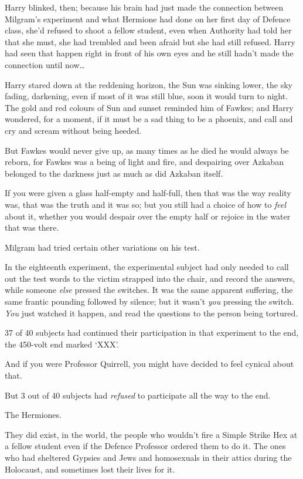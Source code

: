 Harry blinked, then; because his brain had just made the connection between Milgram’s experiment and what Hermione had done on her first day of Defence class, she’d refused to shoot a fellow student, even when Authority had told her that she must, she had trembled and been afraid but she had still refused. Harry had seen that happen right in front of his own eyes and he still hadn’t made the connection until now…

Harry stared down at the reddening horizon, the Sun was sinking lower, the sky fading, darkening, even if most of it was still blue, soon it would turn to night. The gold and red colours of Sun and sunset reminded him of Fawkes; and Harry wondered, for a moment, if it must be a sad thing to be a phoenix, and call and cry and scream without being heeded.

But Fawkes would never give up, as many times as he died he would always be reborn, for Fawkes was a being of light and fire, and despairing over Azkaban belonged to the darkness just as much as did Azkaban itself.

If you were given a glass half-empty and half-full, then that was the way reality was, that was the truth and it was so; but you still had a choice of how to \emph{feel} about it, whether you would despair over the empty half or rejoice in the water that was there.

Milgram had tried certain other variations on his test.

In the eighteenth experiment, the experimental subject had only needed to call out the test words to the victim strapped into the chair, and record the answers, while someone \emph{else} pressed the switches. It was the same apparent suffering, the same frantic pounding followed by silence; but it wasn’t \emph{you} pressing the switch. \emph{You} just watched it happen, and read the questions to the person being tortured.

37 of 40 subjects had continued their participation in that experiment to the end, the 450-volt end marked ‘XXX’.

And if you were Professor Quirrell, you might have decided to feel cynical about that.

But 3 out of 40 subjects had \emph{refused} to participate all the way to the end.

The Hermiones.

They did exist, in the world, the people who wouldn’t fire a Simple Strike Hex at a fellow student even if the Defence Professor ordered them to do it. The ones who had sheltered Gypsies and Jews and homosexuals in their attics during the Holocaust, and sometimes lost their lives for it.

